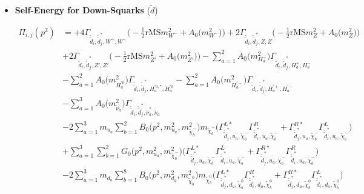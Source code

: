 \begin{itemize} 
\item {\bf Self-Energy for Down-Squarks} \thickspace (\(\tilde{d}\)) 

\begin{align} 
\Pi_{i,j}(p^2) &= +4 {\Gamma_{\check{\tilde{d}}_{{i}},\check{\tilde{d}}^*_{{j}},W^+,W^-}} \Big(-\frac{1}{2} \text{rMS} m^2_{W^-}  + {A_0\Big(m^2_{W^-}\Big)}\Big)+2 {\Gamma_{\check{\tilde{d}}_{{i}},\check{\tilde{d}}^*_{{j}},Z,Z}} \Big(-\frac{1}{2} \text{rMS} m^2_{Z}  + {A_0\Big(m^2_{Z}\Big)}\Big)\nonumber \\ 
 &+2 {\Gamma_{\check{\tilde{d}}_{{i}},\check{\tilde{d}}^*_{{j}},{Z'},{Z'}}} \Big(-\frac{1}{2} \text{rMS} m^2_{{Z'}}  + {A_0\Big(m^2_{{Z'}}\Big)}\Big)- \sum_{a=1}^{2}{A_0\Big(m^2_{H^-_{{a}}}\Big)} {\Gamma_{\check{\tilde{d}}_{{i}},\check{\tilde{d}}^*_{{j}},H^+_{{a}},H^-_{{a}}}}  \nonumber \\ 
 &- \sum_{a=1}^{2}{A_0\Big(m^2_{H^{'0}_{{a}}}\Big)} {\Gamma_{\check{\tilde{d}}_{{i}},\check{\tilde{d}}^*_{{j}},H^{{'0},*}_{{a}},H^{'0}_{{a}}}}  - \sum_{a=1}^{2}{A_0\Big(m^2_{H^{'-}_{{a}}}\Big)} {\Gamma_{\check{\tilde{d}}_{{i}},\check{\tilde{d}}^*_{{j}},H^{'+}_{{a}},H^{'-}_{{a}}}}  \nonumber \\ 
 &- \sum_{a=1}^{3}{A_0\Big(m^2_{\tilde{\nu}_{{a}}}\Big)} {\Gamma_{\check{\tilde{d}}_{{i}},\check{\tilde{d}}^*_{{j}},\tilde{\nu}^*_{{a}},\tilde{\nu}_{{a}}}}  \nonumber \\ 
 &-2 \sum_{a=1}^{3}m_{u_{{a}}} \sum_{b=1}^{2}{B_0\Big(p^{2},m^2_{u_{{a}}},m^2_{\tilde{\chi}^-_{{b}}}\Big)} m_{\tilde{\chi}^-_{{b}}} \Big({\Gamma^{L*}_{\check{\tilde{d}}^*_{{j}},u_{{a}},\tilde{\chi}^-_{{b}}}} {\Gamma^R_{\check{\tilde{d}}^*_{{i}},u_{{a}},\tilde{\chi}^-_{{b}}}}  + {\Gamma^{R*}_{\check{\tilde{d}}^*_{{j}},u_{{a}},\tilde{\chi}^-_{{b}}}} {\Gamma^L_{\check{\tilde{d}}^*_{{i}},u_{{a}},\tilde{\chi}^-_{{b}}}} \Big)  \nonumber \\ 
 &+\sum_{a=1}^{3}\sum_{b=1}^{2}{G_0\Big(p^{2},m^2_{u_{{a}}},m^2_{\tilde{\chi}^-_{{b}}}\Big)} \Big({\Gamma^{L*}_{\check{\tilde{d}}^*_{{j}},u_{{a}},\tilde{\chi}^-_{{b}}}} {\Gamma^L_{\check{\tilde{d}}^*_{{i}},u_{{a}},\tilde{\chi}^-_{{b}}}}  + {\Gamma^{R*}_{\check{\tilde{d}}^*_{{j}},u_{{a}},\tilde{\chi}^-_{{b}}}} {\Gamma^R_{\check{\tilde{d}}^*_{{i}},u_{{a}},\tilde{\chi}^-_{{b}}}} \Big)\nonumber \\ 
 &-2 \sum_{a=1}^{3}m_{d_{{a}}} \sum_{b=1}^{8}{B_0\Big(p^{2},m^2_{d_{{a}}},m^2_{\tilde{\chi}^0_{{b}}}\Big)} m_{\tilde{\chi}^0_{{b}}} \Big({\Gamma^{L*}_{\check{\tilde{d}}^*_{{j}},d_{{a}},\tilde{\chi}^0_{{b}}}} {\Gamma^R_{\check{\tilde{d}}^*_{{i}},d_{{a}},\tilde{\chi}^0_{{b}}}}  + {\Gamma^{R*}_{\check{\tilde{d}}^*_{{j}},d_{{a}},\tilde{\chi}^0_{{b}}}} {\Gamma^L_{\check{\tilde{d}}^*_{{i}},d_{{a}},\tilde{\chi}^0_{{b}}}} \Big)  \nonumber \\ 

\end{align}
\end{itemize}
